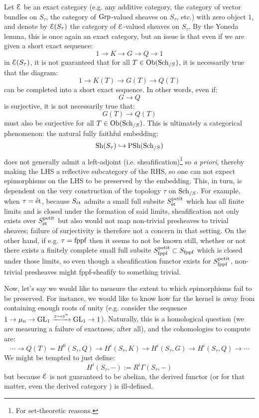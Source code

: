             Let $\mathcal{E}$ be an exact category (e.g. any additive category, the category of vector bundles on $S_{\tau}$, the category of $\mathrm{Grp}$-valued sheaves on $S_{\tau}$, etc.) with zero object $1$, and denote by $\mathcal{E}(S_{\tau})$ the category of $\mathcal{E}$-valued sheaves on $S_{\tau}$. By the Yoneda lemma, this is once again an exact category, but an issue is that even if we are given a short exact sequence:
                $$1 \to K \to G \to Q \to 1$$
            in $\mathcal{E}(S_{\tau})$, it is not guaranteed that for all $T \in \mathrm{Ob}(\mathrm{Sch}_{/S})$, it is necessarily true that the diagram:
                $$1 \to K(T) \to G(T) \to Q(T)$$
            can be completed into a short exact sequence. In other words, even if:
                $$G \to Q$$
            is surjective, it is not necessarily true that:
                $$G(T) \to Q(T)$$
            must also be surjective for all $T \in \mathrm{Ob}(\mathrm{Sch}_{/S})$. This is ultimately a categorical phenomenon: the natural fully faithful embedding:
                $$\mathrm{Sh}(S_{\tau}) \hookrightarrow \mathrm{PSh}(\mathrm{Sch}_{/S})$$
            does not generally admit a left-adjoint (i.e. sheafification)\footnote{For set-theoretic reasons.} so \textit{a priori}, thereby making the LHS a reflective subcategory of the RHS, so one can not expect epimorphisms on the LHS to be preserved by the embedding. This, in turn, is dependent on the very construction of the topology $\tau$ on $\mathrm{Sch}_{/S}$. For example, when $\tau = \mathrm{\acute{e}t}$, because $S_{\mathrm{\acute{e}t}}$ admits a small full subsite $S_{\mathrm{\acute{e}t}}^{\mathrm{petit}}$ which has all finite limits and is closed under the formation of said limits, sheafification not only exists over $S_{\mathrm{\acute{e}t}}^{\mathrm{petit}}$ but also would not map non-trivial presheaves to trivial sheaves; failure of surjectivity is therefore not a concern in that setting. On the other hand, if e.g. $\tau = \mathrm{fppf}$ then it seems to not be known still, whether or not there exists a finitely complete small full subsite $S_{\mathrm{fppf}}^{\mathrm{petit}} \subset S_{\mathrm{fppf}}$ which is closed under those limits, so even though a sheafification functor exists for $S_{\mathrm{fppf}}^{\mathrm{petit}}$, non-trivial presheaves might fppf-sheafify to something trivial. 
    
            Now, let's say we would like to measure the extent to which epimorphisms fail to be preserved. For instance, we would like to know how far the kernel is away from containing enough roots of unity (e.g. consider the sequence $1 \to \mu_n \to \mathrm{GL}_1 \xrightarrow[]{z \leadsto z^n} \mathrm{GL}_1 \to 1$). Naturally, this is a homological question (we are measuring a failure of exactness, after all), and the cohomologies to compute are:
                $$\cdots \to Q(T) = H^0(S_{\tau}, Q) \to H^i(S_{\tau}, K) \to H^i(S_{\tau}, G) \to H^i(S_{\tau}, Q) \to \cdots$$
            We might be tempted to just define:
                $$H^i(S_{\tau}, -) := R^i\Gamma(S_{\tau}, -)$$
            but because $\mathcal{E}$ is not guaranteed to be abelian, the derived functor  (or for that matter, even the derived category ) is ill-defined.
    
